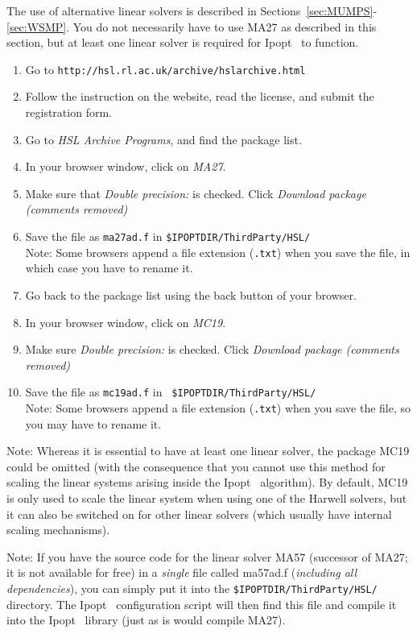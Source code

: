 \documentclass[10pt]{article}
\newcommand{\Ipopt}{{\sc Ipopt }}
\begin{document}
The use of alternative linear solvers is described in
Sections~\ref{sec:MUMPS}-\ref{sec:WSMP}.  You do not necessarily
have to use MA27 as described in this section, but at least one linear
solver is required for \Ipopt\ to function.

\begin{enumerate}
\item Go to {\tt http://hsl.rl.ac.uk/archive/hslarchive.html}
\item Follow the instruction on the website, read the license, and
  submit the registration form.
\item Go to \textit{HSL Archive Programs}, and find the package list.
\item In your browser window, click on \textit{MA27}.
\item Make sure that \textit{Double precision:} is checked. 
  Click \textit{Download package (comments removed)}
\item Save the file as {\tt ma27ad.f} in {\tt \$IPOPTDIR/ThirdParty/HSL/}\\
  Note: Some browsers append a file extension ({\tt .txt}) when you save
  the file, in which case you have to rename it.
\item Go back to the package list using the back button of your browser.
\item In your browser window, click on \textit{MC19}.
\item Make sure \textit{Double precision:} is checked. Click 
  \textit{Download package (comments removed)}
\item Save the file as {\tt mc19ad.f} in {\tt
    \$IPOPTDIR/ThirdParty/HSL/}\\
  Note: Some browsers append a file extension ({\tt .txt}) when you save
  the file, so you may have to rename it.
\end{enumerate}

Note: Whereas it is essential to have at least one linear solver, the
package MC19 could be omitted (with the consequence that you cannot
use this method for scaling the linear systems arising inside the
\Ipopt\ algorithm).  By default, MC19 is only used to scale the linear
system when using one of the Harwell solvers, but it can also be
switched on for other linear solvers (which usually have internal
scaling mechanisms).

Note: If you have the source code for the linear solver MA57
(successor of MA27; it is not available for free) in a \emph{single}
file called ma57ad.f (\emph{including all dependencies}), you can
simply put it into the {\tt \$IPOPTDIR/ThirdParty/HSL/} directory.
The \Ipopt\ configuration script will then find this file and compile
it into the \Ipopt\ library (just as is would compile MA27).
\end{document}

